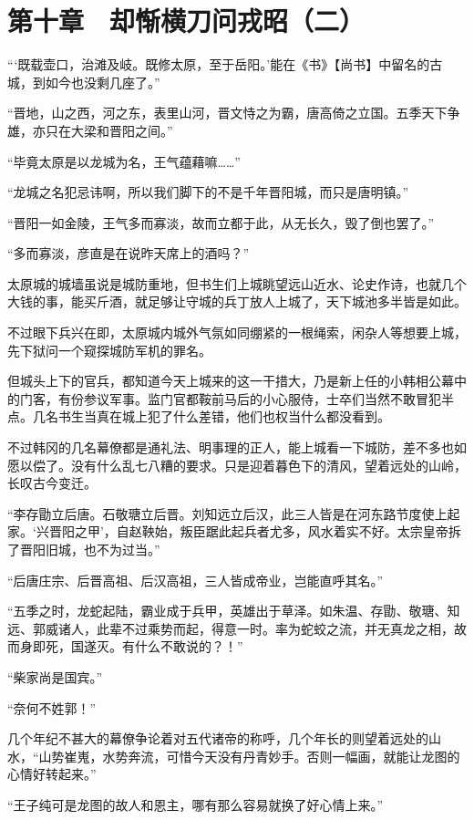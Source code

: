 \section{第十章　却惭横刀问戎昭（二）}

“‘既载壶口，治滩及岐。既修太原，至于岳阳。’能在《书》【尚书】中留名的古城，到如今也没剩几座了。”

“晋地，山之西，河之东，表里山河，晋文恃之为霸，唐高倚之立国。五季天下争雄，亦只在大梁和晋阳之间。”

“毕竟太原是以龙城为名，王气蕴藉嘛……”

“龙城之名犯忌讳啊，所以我们脚下的不是千年晋阳城，而只是唐明镇。”

“晋阳一如金陵，王气多而寡淡，故而立都于此，从无长久，毁了倒也罢了。”

“多而寡淡，彦直是在说昨天席上的酒吗？”

太原城的城墙虽说是城防重地，但书生们上城眺望远山近水、论史作诗，也就几个大钱的事，能买斤酒，就足够让守城的兵丁放人上城了，天下城池多半皆是如此。

不过眼下兵兴在即，太原城内城外气氛如同绷紧的一根绳索，闲杂人等想要上城，先下狱问一个窥探城防军机的罪名。

但城头上下的官兵，都知道今天上城来的这一干措大，乃是新上任的小韩相公幕中的门客，有份参议军事。监门官都鞍前马后的小心服侍，士卒们当然不敢冒犯半点。几名书生当真在城上犯了什么差错，他们也权当什么都没看到。

不过韩冈的几名幕僚都是通礼法、明事理的正人，能上城看一下城防，差不多也如愿以偿了。没有什么乱七八糟的要求。只是迎着暮色下的清风，望着远处的山岭，长叹古今变迁。

“李存勖立后唐。石敬瑭立后晋。刘知远立后汉，此三人皆是在河东路节度使上起家。‘兴晋阳之甲’，自赵鞅始，叛臣踞此起兵者尤多，风水着实不好。太宗皇帝拆了晋阳旧城，也不为过当。”

“后唐庄宗、后晋高祖、后汉高祖，三人皆成帝业，岂能直呼其名。”

“五季之时，龙蛇起陆，霸业成于兵甲，英雄出于草泽。如朱温、存勖、敬瑭、知远、郭威诸人，此辈不过乘势而起，得意一时。率为蛇蛟之流，并无真龙之相，故而身即死，国遂灭。有什么不敢说的？！”

“柴家尚是国宾。”

“奈何不姓郭！”

几个年纪不甚大的幕僚争论着对五代诸帝的称呼，几个年长的则望着远处的山水，“山势崔嵬，水势奔流，可惜今天没有丹青妙手。否则一幅画，就能让龙图的心情好转起来。”

“王子纯可是龙图的故人和恩主，哪有那么容易就换了好心情上来。”

